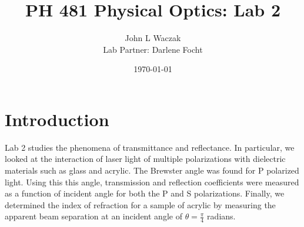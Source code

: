 \documentclass[letter, 11pt, onecolumn]{article}
\title{\vspace{-2.0cm}PH 481 Physical Optics: Lab 2 }
\author{John L Waczak \\ Lab Partner: Darlene Focht}
\date{\today}
\begin{document}
	\maketitle

\section*{Introduction} 
Lab 2 studies the phenomena of transmittance and reflectance. In particular, we looked at the interaction of laser light of multiple polarizations with dielectric materials such as glass and acrylic. The Brewster angle was found for P polarized light. Using this this angle, transmission and reflection coefficients were measured as a function of incident angle for both the P and S polarizations. Finally, we determined the index of refraction for a sample of acrylic by measuring the apparent beam separation at an incident angle of $\theta = \frac{\pi}{4}$ radians. 
\end{document}
